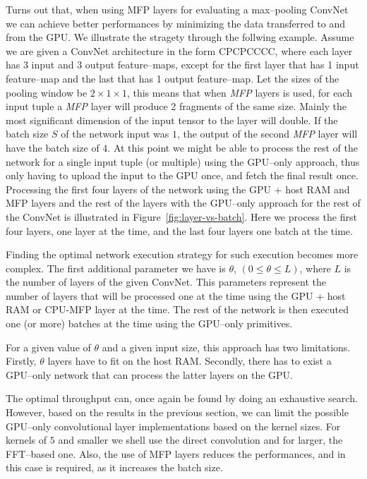 \documentclass[conference]{./IEEEtran/IEEEtran}
\begin{document}
  Turns out that, when using MFP layers for evaluating a max--pooling
  ConvNet we can achieve better performances by minimizing the data
  transferred to and from the GPU.  We illustrate the stragety through
  the follwing example.  Assume we are given a ConvNet architecture in
  the form CPCPCCCC, where each layer has 3 input and 3 output
  feature--maps, except for the first layer that has 1 input
  feature--map and the last that has 1 output feature--map.  Let the
  sizes of the pooling window be $2 \times 1 \times 1$, this means
  that when \emph{MFP} layers is used, for each input tuple a
  \emph{MFP} layer will produce 2 fragments of the same size.  Mainly
  the most significant dimension of the input tensor to the layer will
  double.  If the batch size $S$ of the network input was $1$, the
  output of the second \emph{MFP} layer will have the batch size of
  $4$.  At this point we might be able to process the rest of the
  network for a single input tuple (or multiple) using the GPU--only
  approach, thus only having to upload the input to the GPU once, and
  fetch the final result once.  Processing the first four layers of
  the network using the GPU + host RAM and MFP layers and the rest of
  the layers with the GPU--only approach for the rest of the ConvNet
  is illustrated in Figure~\ref{fig:layer-vs-batch}.  Here we process
  the first four layers, one layer at the time, and the last four
  layers one batch at the time.

  Finding the optimal network execution strategy for such execution
  becomes more complex.  The first additional parameter we have is
  $\theta$, $(0 \le \theta \le L)$, where $L$ is the number of layers
  of the given ConvNet.  This parameters represent the number of
  layers that will be processed one at the time using the GPU + host
  RAM or CPU-MFP layer at the time.  The rest of the network is then
  executed one (or more) batches at the time using the GPU--only
  primitives.

  For a given value of $\theta$ and a given input size, this approach
  has two limitations.  Firstly, $\theta$ layers have to fit on the
  host RAM.  Secondly, there has to exist a GPU--only network that can
  process the latter layers on the GPU.

  The optimal throughput can, once again be found by doing an
  exhaustive search.  However, based on the results in the previous
  section, we can limit the possible GPU--only convolutional layer
  implementations based on the kernel sizes.  For kernels of $5$ and
  smaller we shell use the direct convolution and for larger, the
  FFT--based one.  Also, the use of MFP layers reduces the
  performances, and in this case is required, as it increases the
  batch size.
\end{document}
